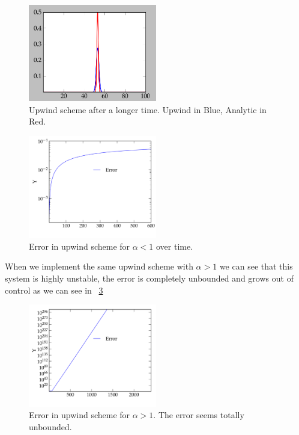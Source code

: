 \documentclass[11pt,letterpaper]{article}
\begin{document}
\begin{figure}[bth]
\centering
\includegraphics[width=0.5\textwidth]{Upwind2.png}
\caption{Upwind scheme after a longer time. Upwind in Blue, Analytic in Red.}
\label{fig:upwind2}
\end{figure}

\begin{figure}[bth]
\centering
\includegraphics[width=0.5\textwidth]{2.pdf}
\caption{Error in upwind scheme for $\alpha < 1$ over time.}
\label{fig:upwinderr}
\end{figure}

When we implement the same upwind scheme with $\alpha > 1$ we can see that this 
system is highly unstable, the error is completely unbounded and grows out of
control as we can see in ~\ref{fig:upwindBIGerr}

\begin{figure}[bth]
\centering
\includegraphics[width=0.5\textwidth]{2b.pdf}
\caption{Error in upwind scheme for $\alpha > 1$. The error seems totally unbounded. }
\label{fig:upwindBIGerr}
\end{figure}
\end{document}
